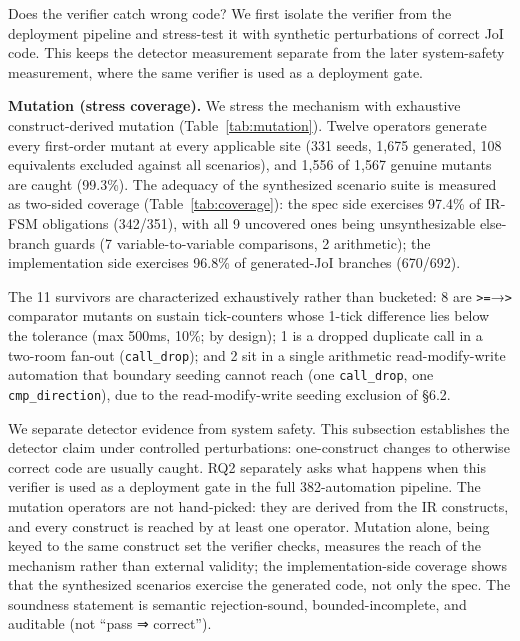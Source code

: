 \documentclass[sigconf,nonacm,anonymous,review]{acmart}
\begin{document}
Does the verifier catch wrong code? We first isolate the verifier from the deployment pipeline and stress-test it with synthetic perturbations of correct JoI code. This keeps the detector measurement separate from the later system-safety measurement, where the same verifier is used as a deployment gate.

\textbf{Mutation (stress coverage).} We stress the mechanism with exhaustive construct-derived mutation (Table~\ref{tab:mutation}). Twelve operators generate every first-order mutant at every applicable site (331 seeds, 1,675 generated, 108 equivalents excluded against all scenarios), and 1,556 of 1,567 genuine mutants are caught (99.3\%). The adequacy of the synthesized scenario suite is measured as two-sided coverage (Table~\ref{tab:coverage}): the spec side exercises 97.4\% of IR-FSM obligations (342/351), with all 9 uncovered ones being unsynthesizable else-branch guards (7 variable-to-variable comparisons, 2 arithmetic); the implementation side exercises 96.8\% of generated-JoI branches (670/692).

The 11 survivors are characterized exhaustively rather than bucketed: 8 are \texttt{>=}→\texttt{>} comparator mutants on sustain tick-counters whose 1-tick difference lies below the tolerance (max 500ms, 10\%; by design); 1 is a dropped duplicate call in a two-room fan-out (\texttt{call\_drop}); and 2 sit in a single arithmetic read-modify-write automation that boundary seeding cannot reach (one \texttt{call\_drop}, one \texttt{cmp\_direction}), due to the read-modify-write seeding exclusion of \S6.2.

We separate detector evidence from system safety. This subsection establishes the detector claim under controlled perturbations: one-construct changes to otherwise correct code are usually caught. RQ2 separately asks what happens when this verifier is used as a deployment gate in the full 382-automation pipeline. The mutation operators are not hand-picked: they are derived from the IR constructs, and every construct is reached by at least one operator. Mutation alone, being keyed to the same construct set the verifier checks, measures the reach of the mechanism rather than external validity; the implementation-side coverage shows that the synthesized scenarios exercise the generated code, not only the spec. The soundness statement is semantic rejection-sound, bounded-incomplete, and auditable (not ``pass ⇒ correct'').
\end{document}
